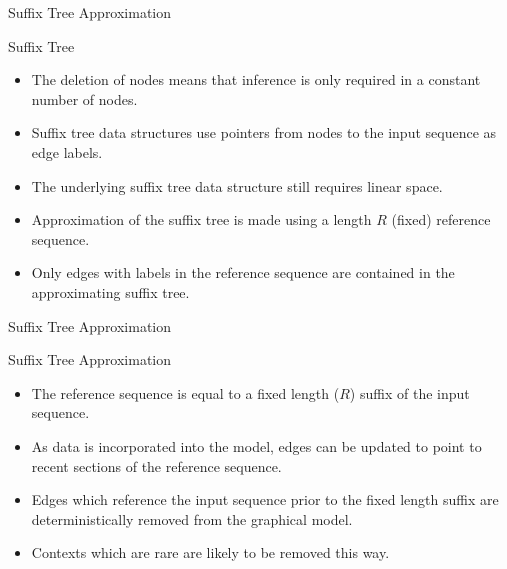 \documentclass{beamer}
\begin{document}
\begin{frame}[t]{Suffix Tree Approximation}

	\begin{block}{Suffix Tree}
		\begin{itemize}
			\item The deletion of nodes means that inference is only required in a constant number of nodes.
                        \item Suffix tree data structures use pointers from nodes to the input sequence as edge labels.
			\item The underlying suffix tree data structure still requires linear space.
			\item Approximation of the suffix tree is made using a length $R$ (fixed) reference sequence.
			\item Only edges with labels in the reference sequence are contained in the approximating suffix tree.
		\end{itemize}
	\end{block}
	
\end{frame}

\begin{frame}[t]{Suffix Tree Approximation}
	
	\begin{block}{Suffix Tree Approximation}
			\begin{itemize}
				\item The reference sequence is equal to a fixed length ($R$) suffix of the input sequence.
				\item As data is incorporated into the model, edges can be updated to point to recent sections of the reference sequence.
				\item Edges which reference the input sequence prior to the fixed length suffix are deterministically removed from the graphical model.
            	\item Contexts which are rare are likely to be removed this way.
			\end{itemize}
	\end{block}
		
\end{frame}
\end{document}

